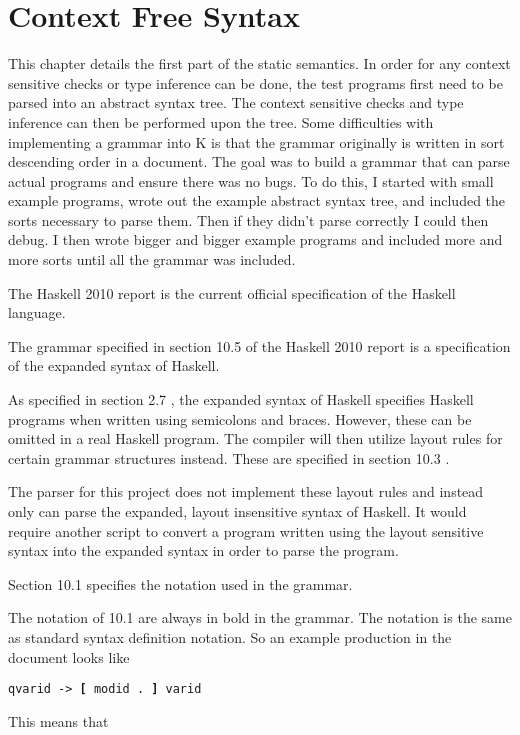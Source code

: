 \chapter{Context Free Syntax}
This chapter details the first part of the static semantics. In order for any context sensitive checks or type inference can be done, the test programs first need to be parsed into an abstract syntax tree. The context sensitive checks and type inference can then be performed upon the tree.
Some difficulties with implementing a grammar into K is that the grammar originally is written in sort descending order in a document. The goal was to build a grammar that can parse actual programs and ensure there was no bugs. To do this, I started with small example programs, wrote out the example abstract syntax tree, and included the sorts necessary to parse them. Then if they didn't parse correctly I could then debug. I then wrote bigger and bigger example programs and included more and more sorts until all the grammar was included.

The Haskell 2010 report \cite{Report:Report} is the current official specification of the Haskell language. 

The grammar specified in section 10.5 of the Haskell 2010 report \cite{Report:Report} is a specification of the expanded syntax of Haskell.

As specified in section 2.7 \cite{Report:Report}, the expanded syntax of Haskell specifies Haskell programs when written using semicolons and braces. However, these can be omitted in a real Haskell program. The compiler will then utilize layout rules for certain grammar structures instead. These are specified in section 10.3 \cite{Report:Report}.

The parser for this project does not implement these layout rules and instead only can parse the expanded, layout insensitive syntax of Haskell. It would require another script to convert a program written using the layout sensitive syntax into the expanded syntax in order to parse the program.

Section 10.1 \cite{Report:Report} specifies the notation used in the grammar.

The notation of 10.1 are always in bold in the grammar. The notation is the same as standard syntax definition notation.
So an example production in the document looks like

\texttt{qvarid -> \textbf{[} modid . \textbf{]} varid}

This means that 

